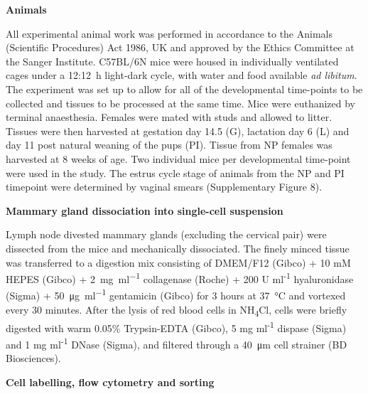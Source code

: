 \documentclass[titlepage, 12pt, oneside]{amsart}
\begin{document}
\textbf{Animals}

All experimental animal work was performed in accordance to the Animals (Scientific Procedures) Act 1986, UK and approved by the Ethics Committee at the Sanger Institute.
C57BL/6N mice were housed in individually ventilated cages under a 12:12~h light-dark cycle, with water and food available \textit{ad libitum}.
The experiment was set up to allow for all of the developmental time-points to be collected and tissues to be processed at the same time.
Mice were euthanized by terminal anaesthesia.
Females were mated with studs and allowed to litter.
Tissues were then harvested at gestation day 14.5 (G), lactation day 6 (L) and day 11 post natural weaning of the pups (PI).
Tissue from NP females was harvested at 8 weeks of age.
Two individual mice per developmental time-point were used in the study.
The estrus cycle stage of animals from the NP and PI timepoint were determined by vaginal smears (Supplementary Figure 8).

\textbf{Mammary gland dissociation into single-cell suspension}

Lymph node divested mammary glands (excluding the cervical pair) were dissected from the mice and mechanically dissociated.
The finely minced tissue was transferred to a digestion mix consisting of DMEM/F12 (Gibco) + 10 mM HEPES (Gibco) + \SI{2}{\milli\gram\per\milli\litre} collagenase (Roche) + 200 U ml\textsuperscript{-1} hyaluronidase (Sigma) + \SI{50}{\micro\gram\per\milli\litre} gentamicin (Gibco) for 3 hours at \SI{37}{\celsius} and vortexed every 30 minutes.
After the lysis of red blood cells in NH\textsubscript{4}Cl, cells were briefly digested with warm 0.05\% Trypsin-EDTA (Gibco), 5 mg ml\textsuperscript{-1} dispase (Sigma) and 1 mg ml\textsuperscript{-1} DNase (Sigma), and filtered through a \SI{40}{\micro\meter} cell strainer (BD Biosciences).

\textbf{Cell labelling, flow cytometry and sorting}
\end{document}

